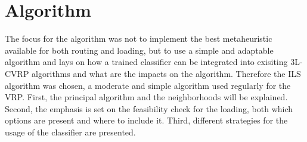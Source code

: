 \chapter{Algorithm}
\label{chap:algorithm}
The focus for the algorithm was not to implement the best metaheuristic available for both routing and loading, but
to use a simple and adaptable algorithm and lays on how a trained classifier can
be integrated into exisiting \gls{3L-CVRP} algorithms and what are the impacts on the algorithm. Therefore the \gls{ILS}
algorithm was chosen, a moderate and simple algorithm used regularly for the \gls{VRP}. First, the principal
algorithm and the neighborhoods will be explained. Second, the emphasis is set on the feasibility check for the loading,
both which options are present and where to include it. Third, different strategies for the usage of the
classifier are presented.

